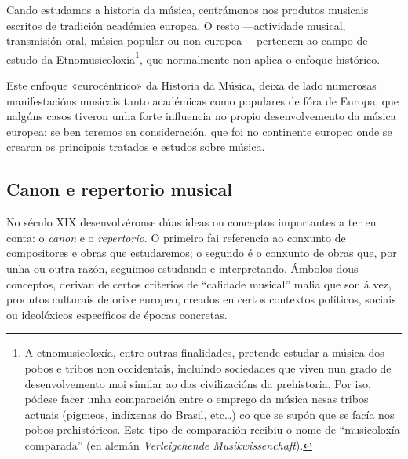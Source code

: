 \documentclass[a4paper, twoside]{templates/ociamthesis}
\begin{document}
Cando estudamos a historia da música, centrámonos nos produtos musicais escritos de tradición académica europea. O resto ---actividade musical, transmisión oral, música popular ou non europea--- pertencen ao campo de estudo da Etnomusicoloxía\footnote{A etnomusicoloxía, entre outras finalidades, pretende estudar a música dos pobos e tribos non occidentais, incluíndo sociedades que viven nun grado de desenvolvemento moi similar ao das civilizacións da prehistoria. Por iso, pódese facer unha comparación entre o emprego da música nesas tribos actuais (pigmeos, indíxenas do Brasil, etc\ldots) co que se supón que se facía nos pobos prehistóricos. Este tipo de comparación recibiu o nome de ``musicoloxía comparada'' (en alemán \emph{Verleigchende Musikwissenchaft}).}, que normalmente non aplica o enfoque histórico.

Este enfoque «eurocéntrico» da Historia da Música, deixa de lado numerosas manifestacións musicais tanto académicas como populares de fóra de Europa, que nalgúns casos tiveron unha forte influencia no propio desenvolvemento da música europea; se ben teremos en consideración, que foi no continente europeo onde se crearon os principais tratados e estudos sobre música.

\hypertarget{canon-e-repertorio-musical}{%
\subsection*{Canon e repertorio musical}\label{canon-e-repertorio-musical}}

No século XIX desenvolvéronse dúas ideas ou conceptos importantes a ter en conta: o \emph{canon} e o \emph{repertorio}. O primeiro fai referencia ao conxunto de compositores e obras que estudaremos; o segundo é o conxunto de obras que, por unha ou outra razón, seguimos estudando e interpretando. Ámbolos dous conceptos, derivan de certos criterios de ``calidade musical'' malia que son á vez, produtos culturais de orixe europeo, creados en certos contextos políticos, sociais ou ideolóxicos específicos de épocas concretas.
\end{document}
